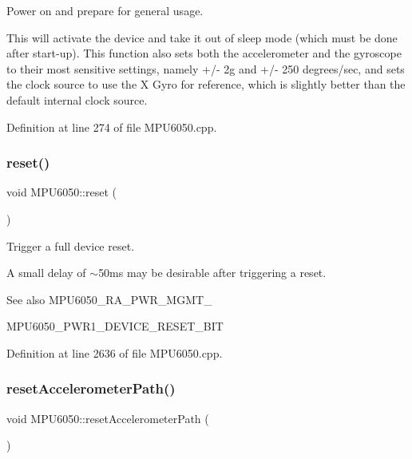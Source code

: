 Power on and prepare for general usage. 

This will activate the device and take it out of sleep mode (which must be done after start-\/up). This function also sets both the accelerometer and the gyroscope to their most sensitive settings, namely +/-\/ 2g and +/-\/ 250 degrees/sec, and sets the clock source to use the X Gyro for reference, which is slightly better than the default internal clock source. 

Definition at line 274 of file M\+P\+U6050.\+cpp.

\mbox{\label{classMPU6050_a7100b6d276c3c8664cf00d768b7b0dee}} 
\subsubsection{\texorpdfstring{reset()}{reset()}}
{\footnotesize\ttfamily void M\+P\+U6050\+::reset (\begin{DoxyParamCaption}{ }\end{DoxyParamCaption})}



Trigger a full device reset. 

A small delay of $\sim$50ms may be desirable after triggering a reset. \begin{DoxySeeAlso}{See also}
M\+P\+U6050\+\_\+\+R\+A\+\_\+\+P\+W\+R\+\_\+\+M\+G\+M\+T\+\_ 

M\+P\+U6050\+\_\+\+P\+W\+R1\+\_\+\+D\+E\+V\+I\+C\+E\+\_\+\+R\+E\+S\+E\+T\+\_\+\+B\+IT 
\end{DoxySeeAlso}


Definition at line 2636 of file M\+P\+U6050.\+cpp.

\mbox{\label{classMPU6050_a99ee74708c12f32e48ef5ec69ac9f4a9}} 
\subsubsection{\texorpdfstring{resetAccelerometerPath()}{resetAccelerometerPath()}}
{\footnotesize\ttfamily void M\+P\+U6050\+::reset\+Accelerometer\+Path (\begin{DoxyParamCaption}{ }\end{DoxyParamCaption})}



